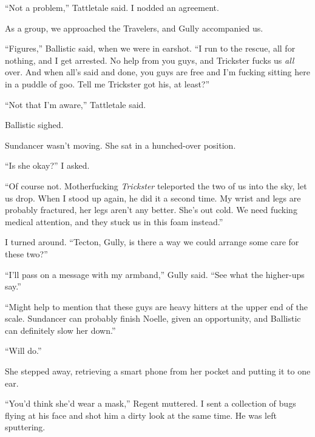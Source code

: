 ``Not a problem,'' Tattletale said.  I nodded an agreement.



As a group, we approached the Travelers, and Gully accompanied us.



``Figures,'' Ballistic said, when we were in earshot.  ``I run to the rescue, all for nothing, and I get arrested.  No help from you guys, and Trickster fucks us \emph{all} over.  And when all's said and done, you guys are free and I'm fucking sitting here in a puddle of goo.  Tell me Trickster got his, at least?''



``Not that I'm aware,'' Tattletale said.



Ballistic sighed.



Sundancer wasn't moving.  She sat in a hunched-over position.



``Is she okay?'' I asked.



``Of course not.  Motherfucking \emph{Trickster} teleported the two of us into the sky, let us drop.  When I stood up again, he did it a second time.  My wrist and legs are probably fractured, her legs aren't any better.  She's out cold.  We need fucking medical attention, and they stuck us in this foam instead.''



I turned around.  ``Tecton, Gully, is there a way we could arrange some care for these two?''



``I'll pass on a message with my armband,'' Gully said.  ``See what the higher-ups say.''



``Might help to mention that these guys are heavy hitters at the upper end of the scale.  Sundancer can probably finish Noelle, given an opportunity, and Ballistic can definitely slow her down.''



``Will do.''



She stepped away, retrieving a smart phone from her pocket and putting it to one ear.



``You'd think she'd wear a mask,'' Regent muttered.  I sent a collection of bugs flying at his face and shot him a dirty look at the same time.  He was left sputtering.



